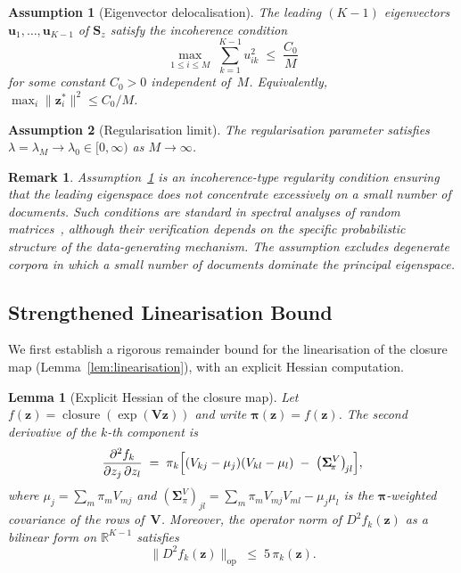 \documentclass{article}
\newtheorem{lemma}[theorem]{Lemma}
\newtheorem{remark}{Remark}
\newtheorem{assumption}{Assumption}
\DeclareMathOperator{\closure}{closure}
\begin{document}
\begin{assumption}[Eigenvector delocalisation]
\label{ass:delocalisation}
The leading $(K{-}1)$ eigenvectors $\mathbf{u}_1,\dots,\mathbf{u}_{K-1}$
of $\mathbf{S}_z$ satisfy the incoherence condition
\begin{equation}
  \max_{1\le i\le M}\;
  \sum_{k=1}^{K-1} u_{ik}^2
  \;\leq\;
  \frac{C_0}{M}
  \label{eq:delocalisation}
\end{equation}
for some constant $C_0>0$ independent of~$M$.
Equivalently, $\max_i \|\mathbf{z}_i^*\|^2 \leq C_0/M$.
\end{assumption}

\begin{assumption}[Regularisation limit]
\label{ass:lambda}
The regularisation parameter satisfies
$\lambda = \lambda_M \to \lambda_0 \in [0,\infty)$ as $M\to\infty$.
\end{assumption}

\begin{remark}
Assumption~\ref{ass:delocalisation} is an incoherence-type regularity
condition ensuring that the leading eigenspace does not concentrate
excessively on a small number of documents. Such conditions are
standard in spectral analyses of random
matrices~\citep{candes2009exact}, although their verification depends
on the specific probabilistic structure of the data-generating
mechanism. The assumption excludes degenerate corpora in which a
small number of documents dominate the principal eigenspace.
\end{remark}

\subsection{Strengthened Linearisation Bound}
\label{subsec:strengthened_lemma}

We first establish a rigorous remainder bound for the linearisation of
the closure map (Lemma~\ref{lem:linearisation}), with an explicit
Hessian computation.

\begin{lemma}[Explicit Hessian of the closure map]
\label{lem:hessian}
Let $f(\mathbf{z}) = \closure(\exp(\mathbf{V}\mathbf{z}))$ and write
$\boldsymbol{\pi}(\mathbf{z}) = f(\mathbf{z})$.
The second derivative of the $k$-th component is
\begin{equation}
  \frac{\partial^2 f_k}{\partial z_j\,\partial z_l}
  \;=\;
  \pi_k
  \Bigl[
    (V_{kj}-\mu_j)(V_{kl}-\mu_l)
    \;-\;
    \bigl(\boldsymbol{\Sigma}_{\!\pi}^{V}\bigr)_{\!jl}
  \Bigr],
  \label{eq:hessian_fk}
\end{equation}
where $\mu_j = \sum_m\pi_m V_{mj}$ and
$(\boldsymbol{\Sigma}_{\!\pi}^{V})_{jl}
 = \sum_m\pi_m V_{mj}V_{ml} - \mu_j\mu_l$
is the $\boldsymbol{\pi}$-weighted covariance of the rows
of~$\mathbf{V}$.
Moreover, the operator norm of $D^2\!f_k(\mathbf{z})$ as a bilinear
form on $\mathbb{R}^{K-1}$ satisfies
\begin{equation}
  \|D^2\!f_k(\mathbf{z})\|_{\mathrm{op}}
  \;\leq\;
  5\,\pi_k(\mathbf{z}).
  \label{eq:hessian_bound}
\end{equation}
\end{lemma}
\end{document}
